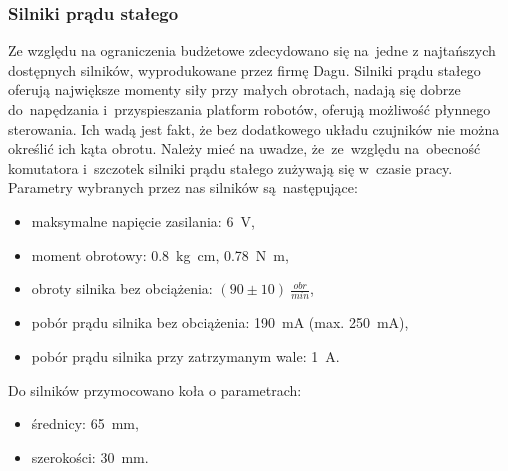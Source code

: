 \documentclass[11pt]{article}
\begin{document}
\subsubsection{Silniki prądu stałego}
Ze względu na ograniczenia budżetowe zdecydowano się na~jedne z najtańszych dostępnych silników, wyprodukowane przez firmę Dagu.
Silniki prądu stałego oferują największe momenty siły przy małych obrotach, nadają się dobrze do~napędzania i~przyspieszania platform robotów, oferują możliwość płynnego sterowania.
Ich wadą jest fakt, że bez dodatkowego układu czujników nie można określić ich kąta obrotu.
Należy mieć na uwadze, że~ze~względu na~obecność komutatora i~szczotek silniki prądu stałego zużywają się w~czasie pracy.
Parametry wybranych przez nas silników są~następujące:
\begin{itemize}
	\item maksymalne napięcie zasilania: 6~\si{\volt},
	\item moment obrotowy: \SI[inter-unit-product =\ensuremath{\cdot}]{0,8}{\kilogram\centi\meter}, \SI[inter-unit-product =\ensuremath{\cdot}]{0,78}{\newton\meter},
	\item obroty silnika bez obciążenia: $ (90 \pm 10) \ \frac{obr}{min} $,
	\item pobór prądu silnika bez obciążenia: 190~\si{\milli\ampere} (max. 250~\si{\milli\ampere}),
	\item pobór prądu silnika przy zatrzymanym wale: 1~\si{\ampere}.
\end{itemize}
Do silników przymocowano koła o parametrach:
\begin{itemize}
	\item średnicy: 65~\si{\milli\meter},
	\item szerokości: 30~\si{\milli\meter}.
\end{itemize}
\end{document}
